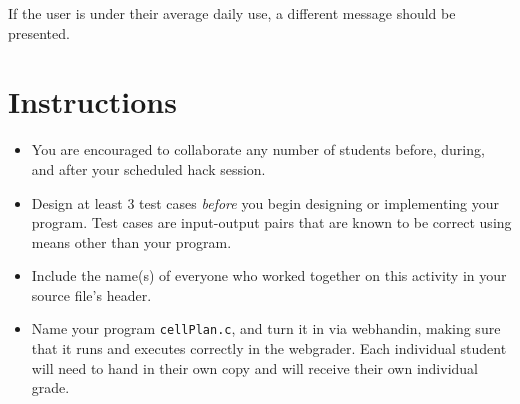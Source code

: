 \documentclass[12pt]{scrartcl}
\begin{document}
If the user is under their average daily use, a different
message should be presented.  

\section*{Instructions}

\begin{itemize}
  \item You are encouraged to collaborate any number of students 
  before, during, and after your scheduled hack session.  
  \item Design at least 3 test cases \emph{before} you begin
  designing or implementing your program.  Test cases are 
  input-output pairs that are known to be correct using means
  other than your program.
  \item Include the name(s) of everyone who worked together on
  this activity in your source file's header.
  \item Name your program \texttt{cellPlan.c}, and
  turn it in via webhandin, making sure that it runs and executes
  correctly in the webgrader.  Each individual student will need
  to hand in their own copy and will receive their own individual
  grade.
\end{itemize}
  
\end{document}
